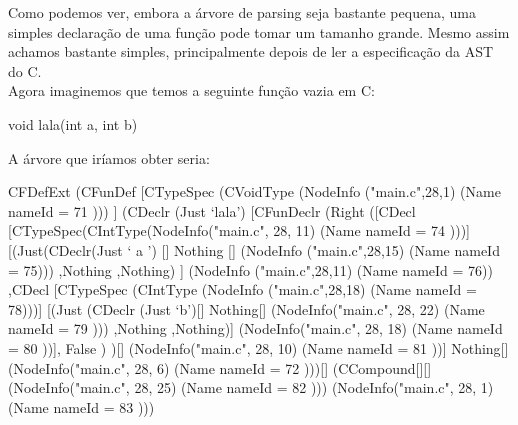 Como podemos ver, embora a árvore de parsing seja bastante pequena, uma simples declaração de uma função
pode tomar um tamanho grande. Mesmo assim achamos bastante simples, principalmente depois de ler a especificação da AST do C.\\

Agora imaginemos que temos a seguinte função vazia em C:
\begin{code_files}
void lala(int a, int b) { }
\end{code_files}

A árvore que iríamos obter seria:
\begin{code_files}
CFDefExt
    (CFunDef
        [CTypeSpec
            (CVoidType (NodeInfo ("main.c",28,1) (Name { nameId = 71 })))
        ]
        (CDeclr
            (Just `lala')
            [CFunDeclr
                (Right
                    ([CDecl
                        [CTypeSpec(CIntType(NodeInfo("main.c", 28, 11) (Name { nameId = 74 })))]
                        [(Just(CDeclr(Just ` a ') [] Nothing
                            [] (NodeInfo ("main.c",28,15) (Name {nameId = 75})))
                        ,Nothing
                        ,Nothing)
                        ] (NodeInfo ("main.c",28,11) (Name {nameId = 76}))
                ,CDecl
                    [CTypeSpec (CIntType (NodeInfo ("main.c",28,18) (Name {nameId = 78})))]
                    [(Just (CDeclr (Just `b')[] Nothing[]
                        (NodeInfo("main.c", 28, 22) (Name { nameId = 79 })))
                        ,Nothing
                        ,Nothing)] (NodeInfo("main.c", 28, 18) (Name { nameId = 80 }))], False
                    )
                )[] (NodeInfo("main.c", 28, 10) (Name { nameId = 81 }))]
                    Nothing[] (NodeInfo("main.c", 28, 6) (Name { nameId = 72 })))[]
        (CCompound[][] (NodeInfo("main.c", 28, 25) (Name { nameId = 82 })))
            (NodeInfo("main.c", 28, 1) (Name { nameId = 83 })))
\end{code_files}

